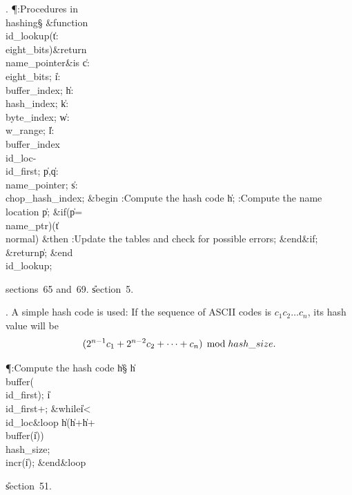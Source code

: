 . \P\?:Procedures in \\{hashing}\X\S\?\6
\&{function}\8\1\\{id\_lookup}\?(\1\?\|t\?:\?\\{eight\_bits}\?\2)\&{return}\?\8%
\\{name\_pointer}\2\8\&{is}\8\1\6
\|c\?:\?\\{eight\_bits};\6
\|i\?:\?\\{buffer\_index};\6
\|h\?:\?\\{hash\_index};\6
\|k\?:\?\\{byte\_index};\6
\|w\?:\?\\{w\_range};\6
\|l\?:\?\\{buffer\_index}\?\K\?\\{id\_loc}\?-\?\\{id\_first};\6
\|p\?,\?\|q\?:\?\\{name\_pointer};\6
\|s\?:\?\\{chop\_hash\_index};\6
\4\&{begin}\6
:Compute the hash code \|h\X;\6
:Compute the name location \|p\X;\6
\&{if}\1\1\?\8\1(\?\|p\?=\?\\{name\_ptr}\?\2)\V\1(\?\|t\?\I\?\\{normal}\?\2)\?%
\2\8\&{then}\6
:Update the tables and check for possible errors\X;\2\6
\&{end}\8\2\&{if}\1;\6
\?\&{return}\?\8\|p;\2\6
\&{end}\8\\{id\_lookup};\par
\A sections~65 and~69.
\U section~5\*.\fi

. A simple hash code is used: If the sequence of
ASCII codes is $c_1c_2\ldots c_n$, its hash value will be
$$(2^{n-1}c_1+2^{n-2}c_2+\cdots+c_n)\,\bmod\,\\{hash\_size}.$$

\Y\P\?\4:Compute the hash code \|h\X\S\?\6
\|h\?\K\?\\{buffer}\?\1(\?\\{id\_first}\?\2)\?;\5
\|i\?\K\?\\{id\_first}\?+;\6
\1\&{while}\8\|i\?<\?\\{id\_loc}\8\&{loop}\6
\|h\?\K\1(\?\|h\?+\?\|h\?+\?\\{buffer}\?\1(\?\|i\?\2)\2)\?%
\\{hash\_size};\5
\\{incr}\?\1(\?\|i\?\2)\?;\2\6
\&{end}\8\&{loop}\par
\U section~51.\fi

